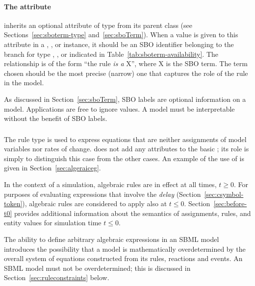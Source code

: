 \paragraph{The  attribute}

\Rule inherits an optional 
attribute of type  from its parent
class \SBase (see Sections~\ref{sec:sboterm-type}
and~\ref{sec:sboTerm}).  When a value is given to this
attribute in a   \AlgebraicRule, \AssignmentRule, or
\RateRule instance, it should be an
SBO identifier belonging to the branch for type  \AlgebraicRule, \AssignmentRule, or
\RateRule indicated in Table~\ref{tab:sboterm-availability}.  The relationship is
of the form ``the rule \emph{is a} X'', where X is
the SBO term.  The term chosen should be the most precise (narrow)
one that captures the role of the rule in the model.

As discussed in Section~\ref{sec:sboTerm}, SBO labels are optional
information on a model.  Applications are free to ignore
 values.  A model must be interpretable without the
benefit of SBO labels.


\subsubsection{}
\label{sec:algebraicrule}

The rule type \AlgebraicRule is used to express equations that are
neither assignments of model variables nor rates of change.
\AlgebraicRule does not add any attributes to the basic \Rule; its
role is simply to distinguish this case from the other cases.  An
example of the use of \AlgebraicRule is given in
Section~\ref{sec:algeraiceg}.

In the context of a simulation, algebraic rules are in effect at
all times, $t \geq 0$.  For purposes of evaluating expressions
that involve the \emph{delay} 
(Section~\ref{sec:csymbol-token}), algebraic rules are considered
to apply also at $t \leq 0$.  Section~\ref{sec:before-t0} provides
additional information about the semantics of assignments, rules,
and entity values for simulation time $t \leq 0$.



The ability to define arbitrary algebraic expressions in an SBML
model introduces the possibility that a model is mathematically
overdetermined by the overall system of equations constructed from
its rules, reactions and events.  An SBML model must not be
overdetermined; this is discussed in
Section~\ref{sec:ruleconstraints} below.




